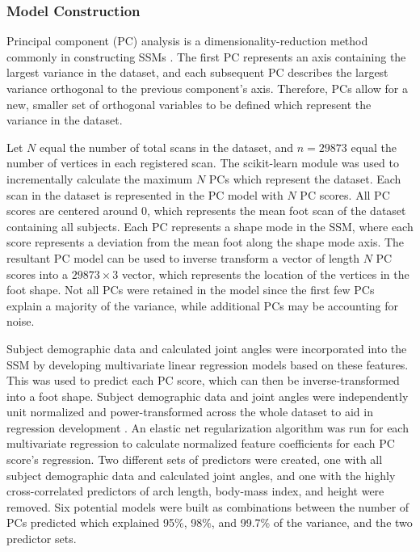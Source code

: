 \documentclass[defaultstyle,11pt]{comps}
\begin{document}
\hypertarget{model-construction}{%
\subsubsection{Model Construction}\label{model-construction}}

Principal component (PC) analysis is a dimensionality-reduction method commonly in constructing SSMs \citep{Reed2008, Park2015a, Conrad2019, Stankovic2020}.
The first PC represents an axis containing the largest variance in the dataset, and each subsequent PC describes the largest variance orthogonal to the previous component's axis.
Therefore, PCs allow for a new, smaller set of orthogonal variables to be defined which represent the variance in the dataset.

Let \(N\) equal the number of total scans in the dataset, and \(n=29873\) equal the number of vertices in each registered scan. The scikit-learn module \citep{JMLR:v12:pedregosa11a} was used to incrementally calculate the maximum \(N\) PCs which represent the dataset.
Each scan in the dataset is represented in the PC model with \(N\) PC scores.
All PC scores are centered around 0, which represents the mean foot scan of the dataset containing all subjects.
Each PC represents a shape mode in the SSM, where each score represents a deviation from the mean foot along the shape mode axis. The resultant PC model can be used to inverse transform a vector of length \(N\) PC scores into a \(29873\times 3\) vector, which represents the location of the vertices in the foot shape. Not all PCs were retained in the model since the first few PCs explain a majority of the variance, while additional PCs may be accounting for noise.

Subject demographic data and calculated joint angles were incorporated into the SSM by developing multivariate linear regression models based on these features.
This was used to predict each PC score, which can then be inverse-transformed into a foot shape.
Subject demographic data and joint angles were independently unit normalized and power-transformed across the whole dataset to aid in regression development \citep{Yeo2000}.
An elastic net regularization algorithm \citep{Zou2005} was run for each multivariate regression to calculate normalized feature coefficients for each PC score's regression.
Two different sets of predictors were created, one with all subject demographic data and calculated joint angles, and one with the highly cross-correlated predictors of arch length, body-mass index, and height were removed.
Six potential models were built as combinations between the number of PCs predicted which explained 95\%, 98\%, and 99.7\% of the variance, and the two predictor sets.
\end{document}
